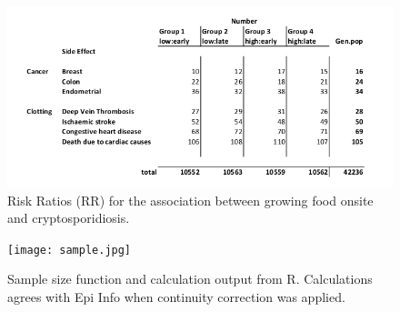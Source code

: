 \documentclass[12pt]{article}
\begin{document}
\begin{figure}[h!]
	\centering
	\includegraphics[scale=0.5]{table2.jpg}
	\caption{Risk Ratios (RR) for the association between growing food onsite and cryptosporidiosis.}
	\label{table2}
\end{figure}

\begin{figure}[h!]
	\centering
	\texttt{[image: sample.jpg]}
	\caption{Sample size function and calculation output from R. Calculations agrees with Epi Info when continuity correction was applied.}
	\label{sample}
\end{figure}

\clearpage


\end{document}
